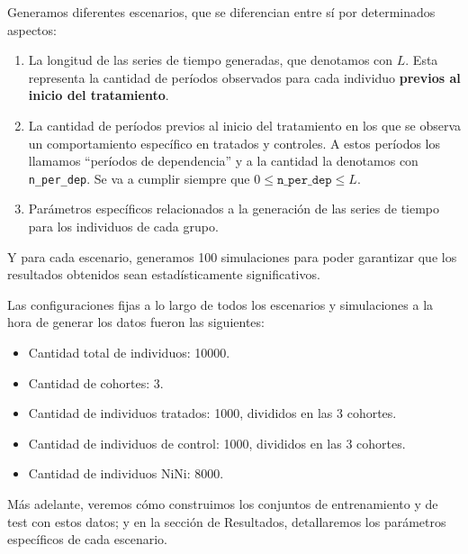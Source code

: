 \documentclass[../../main.tex]{subfiles}
\begin{document}
Generamos diferentes escenarios, que se diferencian entre sí por determinados aspectos:
\begin{enumerate}[itemsep=0.01cm, label=\textbf{\arabic*.}]
    \item La longitud de las series de tiempo generadas, que denotamos con \(L\). Esta
    representa la cantidad de períodos observados para cada individuo \textbf{previos al inicio
    del tratamiento}.
    \item La cantidad de períodos previos al inicio del tratamiento en los que se observa
    un comportamiento específico en tratados y controles. A estos períodos los llamamos
    ``períodos de dependencia'' y a la cantidad la denotamos con \texttt{n\_per\_dep}.
    Se va a cumplir siempre que \(0 \le \texttt{n\_per\_dep} \le L\).
    \item Parámetros específicos relacionados a la generación de las series de tiempo
    para los individuos de cada grupo.
\end{enumerate}
Y para cada escenario, generamos 100 simulaciones para poder garantizar que los resultados
obtenidos sean estadísticamente significativos.

Las configuraciones fijas a lo largo de todos los escenarios y simulaciones a la hora de
generar los datos fueron las siguientes:
\begin{itemize}[noitemsep]
    \item Cantidad total de individuos: 10000.
    \item Cantidad de cohortes: 3.
    \item Cantidad de individuos tratados: 1000, divididos en las 3 cohortes.
    \item Cantidad de individuos de control: 1000, divididos en las 3 cohortes.
    \item Cantidad de individuos NiNi: 8000.
\end{itemize}

Más adelante, veremos cómo construimos los conjuntos de entrenamiento y de test con estos
datos; y en la sección de Resultados, detallaremos los parámetros específicos de cada
escenario.
\end{document}
